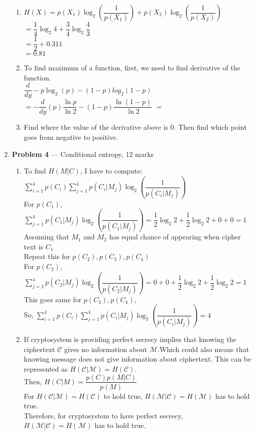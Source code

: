 \documentclass[11pt]{article}
\theoremstyle{definition}
\begin{document}
\begin{enumerate}
	
	\begin{enumerate}
		\item 
		$H(X) = p(X_{1}) \log_{2}(\dfrac{1}{p(X_{1})}) + p(X_{2})\log_{2}(\dfrac{1}{p(X_{2})})$\\
		$= \dfrac{1}{4} \log_{2} 4 + \dfrac{3}{4} \log_{2} \dfrac{4}{3}$\\
		$= \dfrac{1}{2} + 0.311$\\
		$= 0.81$
		\item To find maximum of a function, first, we need to find derivative of the function.\\
		$\dfrac{d}{dy} -p \log_{2}(p)-(1-p)log_{2}(1-p)$\\
		$ =- \dfrac{d}{dy} (p) \dfrac{\ln p}{\ln 2} - (1-p)\dfrac{\ln (1-p)}{\ln 2} $
		$ = $
		
		
		
		\item  Find where the value of the derivative above is 0. Then find which point goes from negative to positive. 
	
	\end{enumerate}
	
	\item[] \textbf{Problem 4} --- Conditional entropy, 12 marks
		
		\begin{enumerate}
			\item To find $H(M|C)$, I have to compute:\\
			$\sum_{i=1}^{4}p(C_{i}) \sum_{j=1}^{4} p(C_{i}|M_{j})\log_{2}(\dfrac{1}{p(C_{i}|M_{j})})$\\
			For $p(C_{1})$, $\sum_{j=1}^{4} p(C_{1}|M_{j})\log_{2}(\dfrac{1}{p(C_{1}|M_{j})}) = \dfrac{1}{2} \log_{2} 2 + \dfrac{1}{2} \log_{2} 2 + 0 + 0 = 1$ Assuming that $M_{1}$ and $M_{2}$ has equal chance of appearing when cipher text is $C_{1}$\\
			Repeat this for $p(C_{2}),p(C_{3}),p(C_{4})$\\
			For $p(C_{2})$, $\sum_{j=2}^{4} p(C_{2}|M_{j})\log_{2}(\dfrac{1}{p(C_{2}|M_{j})}) = 0 + 0  + \dfrac{1}{2} \log_{2} 2 + \dfrac{1}{2} \log_{2} 2 = 1$\\
			This goes same for  $p(C_{3}),p(C_{4})$,\\
			So, $\sum_{i=1}^{4}p(C_{i}) \sum_{j=1}^{4} p(C_{i}|M_{j})\log_{2}(\dfrac{1}{p(C_{i}|M_{j})}) = 4$
			\item If cryptosystem is providing perfect secrecy implies that knowing the ciphertext $\mathcal{C}$ gives no information about $\mathcal{M}$.Which could also means that knowing message does not give information about ciphertext. This can be represented as
			$H(\mathcal{C}|\mathcal{M}) = H(\mathcal{C})$.\\
			Then, $H(C|M) = \dfrac{p(C)p(M|C)}{p(M)}$\\
			For $H(\mathcal{C}|\mathcal{M}) = H(\mathcal{C})$ to hold true,  $H(\mathcal{M}|\mathcal{C}) = H(\mathcal{M})$ has to hold true.\\
			Therefore, for cryptosystem to have perfect secrecy, $H(\mathcal{M}|\mathcal{C}) = H(\mathcal{M})$ has to hold true.
			

\end{enumerate}
\end{enumerate}
\end{document}
